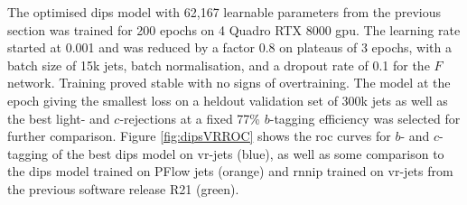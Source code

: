 The optimised \gls{dips} model with 62,167 learnable parameters from the previous section was trained for 200 epochs on 4 Quadro RTX 8000 \gls{gpu}. The learning rate started at 0.001 and was reduced by a factor 0.8 on plateaus of 3 epochs, with a batch size of 15k jets, batch normalisation, and a dropout rate of 0.1 for the $F$ network. Training proved stable with no signs of overtraining. The model at the epoch giving the smallest loss on a heldout validation set of 300k jets as well as the best light- and $c$-rejections at a fixed 77\% $b$-tagging efficiency was selected for further comparison. Figure \ref{fig:dipsVRROC} shows the \gls{roc} curves for $b$- and $c$-tagging of the best \gls{dips} model on \gls{vr}-jets (blue), as well as some comparison to the \gls{dips} model trained on PFlow jets (orange) and \gls{rnnip} trained on \gls{vr}-jets from the previous software release R21 (green). 

